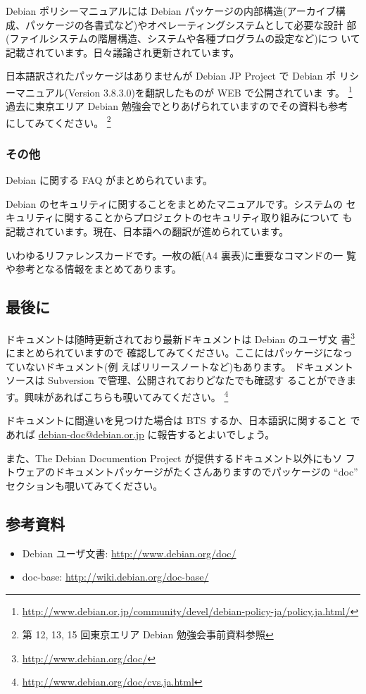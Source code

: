 \documentclass[mingoth,a4paper]{jsarticle}
\begin{document}
Debian ポリシーマニュアルには Debian パッケージの内部構造(アーカイブ構
成、パッケージの各書式など)やオペレーティングシステムとして必要な設計
部(ファイルシステムの階層構造、システムや各種プログラムの設定など)につ
いて記載されています。日々議論され更新されています。

日本語訳されたパッケージはありませんが Debian JP Project で Debian ポ
リシーマニュアル(Version 3.8.3.0)を翻訳したものが WEB で公開されていま
す。
\footnote{\url{http://www.debian.or.jp/community/devel/debian-policy-ja/policy.ja.html/}}
過去に東京エリア Debian 勉強会でとりあげられていますのでその資料も参考
にしてみてください。
\footnote{第 12, 13, 15 回東京エリア Debian 勉強会事前資料参照}


\subsubsection{その他}
Debian に関する FAQ がまとめられています。


Debian のセキュリティに関することをまとめたマニュアルです。システムの
セキュリティに関することからプロジェクトのセキュリティ取り組みについて
も記載されています。現在、日本語への翻訳が進められています。


いわゆるリファレンスカードです。一枚の紙(A4 裏表)に重要なコマンドの一
覧や参考となる情報をまとめてあります。


\subsection{最後に}

ドキュメントは随時更新されており最新ドキュメントは  Debian のユーザ文
書\footnote{\url{http://www.debian.org/doc/}}にまとめられていますので
確認してみてください。ここにはパッケージになっていないドキュメント(例
えばリリースノートなど)もあります。
ドキュメントソースは Subversion で管理、公開されておりどなたでも確認す
ることができます。興味があればこちらも覗いてみてください。
\footnote{\url{http://www.debian.org/doc/cvs.ja.html}}

ドキュメントに間違いを見つけた場合は BTS するか、日本語訳に関すること
であれば \url{debian-doc@debian.or.jp} に報告するとよいでしょう。

また、The Debian Documention Project が提供するドキュメント以外にもソ
フトウェアのドキュメントパッケージがたくさんありますのでパッケージの
``doc'' セクションも覗いてみてください。

\subsection{参考資料}
\begin{itemize}
 \item Debian ユーザ文書: \url{http://www.debian.org/doc/}
 \item doc-base: \url{http://wiki.debian.org/doc-base/}
\end{itemize}
\end{document}
